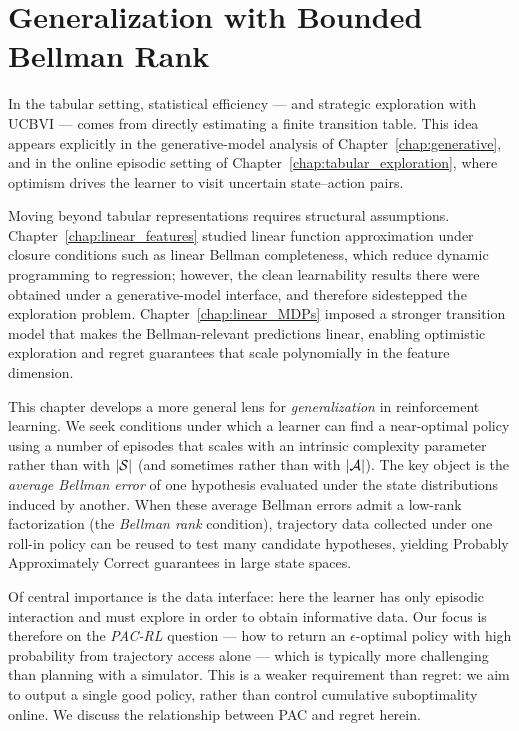 \chapter{Generalization with Bounded Bellman Rank}
\label{chap:Bellman_rank}

In the tabular setting, statistical efficiency — and strategic
exploration with UCBVI — comes from
directly estimating a finite transition table.  This idea appears explicitly in the generative-model
analysis of Chapter~\ref{chap:generative}, and in the online episodic setting of
Chapter~\ref{chap:tabular_exploration}, where optimism drives the learner to visit uncertain
state--action pairs. 

Moving beyond tabular representations requires structural assumptions.
Chapter~\ref{chap:linear_features} studied linear function
approximation under closure conditions such as linear Bellman
completeness, which reduce dynamic programming to regression; however,
the clean learnability results there were obtained under a
generative-model interface, and therefore sidestepped the exploration
problem.  Chapter~\ref{chap:linear_MDPs} imposed a stronger transition
model that makes the Bellman-relevant predictions linear, enabling
optimistic exploration and regret guarantees that scale polynomially
in the feature dimension.

This chapter develops a more general lens for \emph{generalization} in
reinforcement learning.  We seek conditions under which a learner can
find a near-optimal policy using a number of episodes that scales with an intrinsic complexity parameter rather than with $|\mathcal{S}|$ (and sometimes rather than with
$|\mathcal{A}|$).  The key object is the \emph{average Bellman error} of one hypothesis evaluated under the
state distributions induced by another.  When these average Bellman
errors admit a low-rank factorization 
(the \emph{Bellman rank} condition), trajectory data collected under
one roll-in policy can be reused to test many candidate hypotheses, yielding Probably Approximately Correct guarantees in large state spaces.

Of central importance is the data interface: here the learner has only
episodic interaction and must explore in order to obtain informative
data. Our focus is therefore on the \emph{PAC-RL} question — how to
return an $\epsilon$-optimal policy with high probability from
trajectory access alone — which is typically more challenging than
planning with a simulator. This is a weaker requirement than regret:
we aim to output a single good policy, rather than control cumulative
suboptimality online. We discuss the relationship between PAC and
regret herein. 


